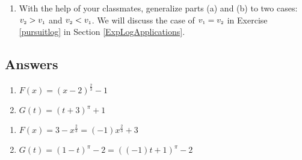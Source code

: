 \documentclass{ximera}
\begin{document}
\begin{enumerate}
\begin{enumerate}
\item  With the help of your classmates, generalize parts (a) and (b) to two cases:  $v_{\mbox{\tiny$2$}} > v_{\mbox{\tiny$1$}}$ and $v_{\mbox{\tiny$2$}} < v_{\mbox{\tiny$1$}}$.   We will discuss the case of $v_{\mbox{\tiny$1$}} = v_{\mbox{\tiny$2$}}$ in Exercise \ref{pursuitlog} in Section \ref{ExpLogApplications}.

\end{enumerate}

\setcounter{HW}{\value{enumi}}
\end{enumerate}

\newpage

\subsection{Answers}

\begin{multicols}{2}
\begin{enumerate}

\item  $F(x) = (x-2)^{\frac{2}{3}}-1$ \\





\columnbreak


\item $G(t) = (t+3)^{\pi} +1$ \\





\setcounter{HW}{\value{enumi}}
\end{enumerate}
\end{multicols}

\begin{multicols}{2}
\begin{enumerate}
\setcounter{enumi}{\value{HW}}
\item  $F(x) = 3-x^{\frac{2}{3}} = (-1)x^{\frac{2}{3}} + 3$  \\





\columnbreak


\item  $G(t) = (1-t)^{\pi}-2 = ((-1)t+1)^{\pi}-2$   \\




\setcounter{HW}{\value{enumi}}
\end{enumerate}
\end{multicols}
\end{document}
